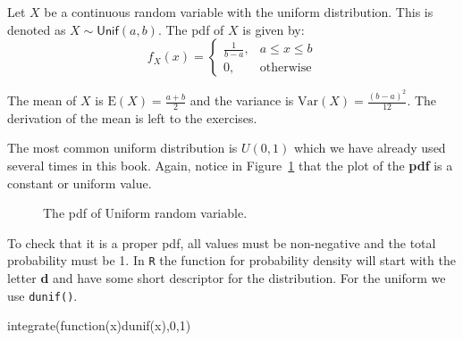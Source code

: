 \documentclass[
  letterpaper,
  DIV=11,
  numbers=noendperiod]{scrreprt}
\newenvironment{Shaded}{\begin{snugshade}}{\end{snugshade}}
\newcommand{\ControlFlowTok}[1]{\textcolor[rgb]{0.00,0.23,0.31}{#1}}
\newcommand{\DecValTok}[1]{\textcolor[rgb]{0.68,0.00,0.00}{#1}}
\newcommand{\FunctionTok}[1]{\textcolor[rgb]{0.28,0.35,0.67}{#1}}
\newcommand{\NormalTok}[1]{\textcolor[rgb]{0.00,0.23,0.31}{#1}}
\begin{document}
Let \(X\) be a continuous random variable with the uniform distribution.
This is denoted as \(X\sim \textsf{Unif}(a,b)\). The pdf of \(X\) is
given by: \[
f_X(x)=\left\{\begin{array}{ll} \frac{1}{b-a}, & a\leq x \leq b \\ 0, & \mbox{otherwise} \end{array}\right.
\]

The mean of \(X\) is \(\mbox{E}(X)=\frac{a+b}{2}\) and the variance is
\(\mbox{Var}(X)=\frac{(b-a)^2}{12}\). The derivation of the mean is left
to the exercises.

The most common uniform distribution is \(U(0,1)\) which we have already
used several times in this book. Again, notice in Figure~\ref{fig-uni}
that the plot of the \textbf{pdf} is a constant or uniform value.

\begin{figure}


\caption{\label{fig-uni}The pdf of Uniform random variable.}

\end{figure}%

To check that it is a proper pdf, all values must be non-negative and
the total probability must be 1. In \texttt{R} the function for
probability density will start with the letter \textbf{d} and have some
short descriptor for the distribution. For the uniform we use
\texttt{dunif()}.

\begin{Shaded}
\begin{Highlighting}[]
\FunctionTok{integrate}\NormalTok{(}\ControlFlowTok{function}\NormalTok{(x)}\FunctionTok{dunif}\NormalTok{(x),}\DecValTok{0}\NormalTok{,}\DecValTok{1}\NormalTok{)}
\end{Highlighting}
\end{Shaded}
\end{document}
